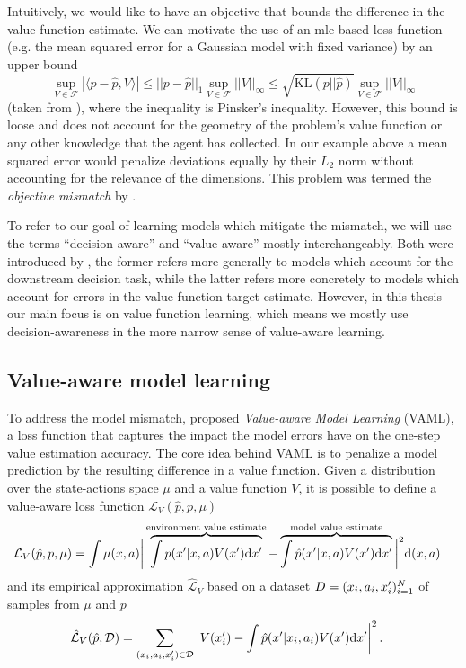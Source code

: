 Intuitively, we would like to have an objective that bounds the difference in the value function estimate.
We can motivate the use of an \ac{mle}-based loss function (e.g. the mean squared error for a Gaussian model with fixed variance) {by an upper bound}
$$\sup_{V \in \mathcal{F}}|\langle p - \hat{p}, V\rangle|\leq ||p - \hat{p}||_1 \sup_{V \in \mathcal{F}}||V||_\infty \leq \sqrt{\text{KL}(p||\hat{p})}\sup_{V \in \mathcal{F}}||V||_\infty$$ 
(taken from
\textcite{vaml}), where the inequality is Pinsker's inequality.
However, this bound is loose and does not account for the geometry of the problem's value function or any other knowledge that the agent has collected. 
In our example above a mean squared error would penalize deviations equally by their $L_2$ norm without accounting for the relevance of the dimensions.
This problem was termed the \emph{objective mismatch} by \textcite{lambert202objective}.

To refer to our goal of learning models which mitigate the mismatch, we will use the terms ``decision-aware'' and ``value-aware'' mostly interchangeably.
Both were introduced by \textcite{vaml}, the former refers more generally to models which account for the downstream decision task, while the latter refers more concretely to models which account for errors in the value function target estimate.
However, in this thesis our main focus is on value function learning, which means we mostly use decision-awareness in the more narrow sense of value-aware learning.

\subsection{Value-aware model learning}

To address the model mismatch, \textcite{vaml} proposed \emph{Value-aware Model Learning} (VAML), a loss function that captures the impact the model errors have on the one-step value estimation accuracy.
The core idea behind VAML is to penalize a model prediction by the resulting difference in a value function. Given a distribution over the state-actions space $\mu$ and a value function $V$, it is possible to define a value-aware loss function $\mathcal{L}_V(\hat{p}, p, \mu)$
\begin{align}
    &\mathcal{L}_V(\hat{p}, p, \mu) = \int \mu(x,a) \bigg|\overbrace{\int p(x'|x,a)V(x')\mathrm{d}x'}^{\text{environment value estimate}}  - \overbrace{\int \hat{p}(x'|x,a) V(x') \mathrm{d}x'}^{\text{model value estimate}}\bigg|^2 \mathrm{d} (x,a)
\end{align}
and its empirical approximation $\hat{\mathcal{L}}_V$ based on a dataset $D = (x_i,a_i,x'_i)_{i=1}^N$ of samples from $\mu$ and $p$
\begin{align}
    &\hat{\mathcal{L}}_V(\hat{p}, \mathcal{D}) = \sum_{(x_i,a_i,x'_i)\in\mathcal{D}} \left|V(x'_i) - \int \hat{p}(x'|x_i,a_i) V(x') \mathrm{d} x'\right|^2\label{IterVAMLloss}.
\end{align}

